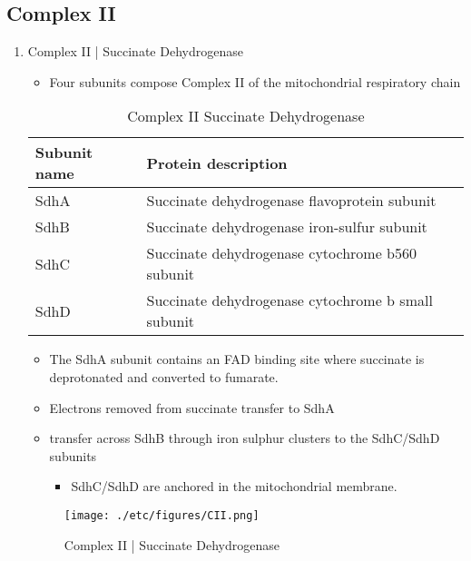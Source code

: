 \documentclass{scrartcl}
\begin{document}
\subsection{Complex II}
\label{sec:org97ed545}
\begin{enumerate}
\item Complex II | Succinate Dehydrogenase
\label{sec:org5bde501}
\begin{itemize}
\item Four subunits compose Complex II of the mitochondrial respiratory chain
\end{itemize}

\begin{table}[htbp]
\caption{\label{tab:org32a3433}
Complex II Succinate Dehydrogenase}
\centering
\begin{tabular}{ll}
Subunit name & Protein description\\
\hline
SdhA & Succinate dehydrogenase flavoprotein subunit\\
SdhB & Succinate dehydrogenase iron-sulfur subunit\\
SdhC & Succinate dehydrogenase cytochrome b560 subunit\\
SdhD & Succinate dehydrogenase cytochrome b small subunit\\
\end{tabular}
\end{table}

\begin{itemize}
\item The SdhA subunit contains an FAD binding site where succinate
is deprotonated and converted to fumarate.
\end{itemize}

{\small{}}

\begin{itemize}
\item Electrons removed from succinate transfer to SdhA
\item transfer across SdhB through iron sulphur clusters to the SdhC/SdhD subunits
\begin{itemize}
\item SdhC/SdhD are anchored in the mitochondrial membrane.
\end{itemize}
\end{itemize}

\begin{figure}[htbp]
\centering
\texttt{[image: ./etc/figures/CII.png]}
\caption[cII]{\label{fig:org4ce26c8}
Complex II | Succinate Dehydrogenase}
\end{figure}


\end{enumerate}
\end{document}
